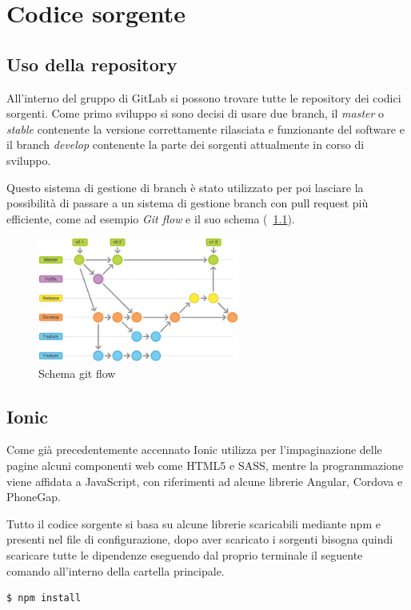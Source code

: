 \documentclass[a4paper,titlepage]{book}
\begin{document}
\chapter{Codice sorgente}
\section{Uso della repository}
All'interno del gruppo di GitLab si possono trovare tutte le repository dei codici sorgenti. Come primo sviluppo si sono decisi di usare due branch, il \textit{master} o \textit{stable} contenente la versione correttamente rilasciata e funzionante del software e il branch \textit{develop} contenente la parte dei sorgenti attualmente in corso di sviluppo.

Questo sistema di gestione di branch \`{e} stato utilizzato per poi lasciare la possibilità di passare a un sistema di gestione branch con pull request pi\`{u} efficiente, come ad esempio \textit{Git flow} e il suo schema (\figurename~\ref{fig:git_flow}).

\begin{figure}
\center
\includegraphics[width=250px]{imgs/git_flow.png}
\caption{Schema git flow \label{fig:git_flow}}
\end{figure} 

\section{Ionic}
Come gi\`{a} precedentemente accennato Ionic utilizza per l'impaginazione delle pagine alcuni componenti web come HTML5 e SASS, mentre la programmazione viene affidata a JavaScript, con riferimenti ad alcune librerie Angular, Cordova e PhoneGap.

Tutto il codice sorgente si basa su alcune librerie scaricabili mediante npm e presenti nel file di configurazione, dopo aver scaricato i sorgenti bisogna quindi scaricare tutte le dipendenze eseguendo dal proprio terminale il seguente comando all'interno della cartella principale.

\begin{lstlisting}[language=bash]
  $ npm install
\end{lstlisting}
\end{document}

